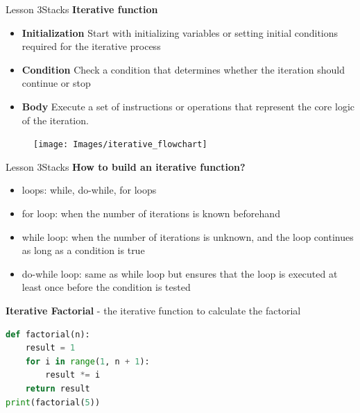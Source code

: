 \documentclass[aspectratio=1610]{beamer}
\begin{document}
\begin{frame}{Lesson 3}{Stacks}
\LARGE
\textbf{Iterative function}\\
\begin{minipage}{0.60\textwidth}
\Large
\begin{itemize}
    \item \textbf{Initialization} Start with initializing variables or setting initial conditions required for the iterative process
    \item \textbf{Condition} Check a condition that determines whether the iteration should continue or stop
    \item \textbf{Body} Execute a set of instructions or operations that represent the core logic of the iteration. 
\end{itemize}
  \end{minipage}
\begin{minipage}{.0\textwidth}
      \begin{figure}
        \texttt{[image: Images/iterative\_flowchart]}
      \end{figure}
  \end{minipage}  
\end{frame}



\begin{frame}{Lesson 3}{Stacks}
\LARGE
\textbf{How to build an iterative function?}\\
\begin{itemize}
    \item loops: while, do-while, for loops
    \item for loop: when the number of iterations is known beforehand
    \item while loop: when the number of iterations is unknown, and the loop continues as long as a condition is true
    \item do-while loop: same as while loop but ensures that the loop is executed at least once before the condition is tested
\end{itemize}
\end{frame}



\begin{frame}[fragile]
\LARGE
\textbf{Iterative Factorial} - the iterative function to calculate the factorial\\
\Large
\begin{lstlisting}[language=Python]
def factorial(n):
    result = 1
    for i in range(1, n + 1):
        result *= i
    return result
print(factorial(5))
 \end{lstlisting}
\end{frame}
\end{document}
